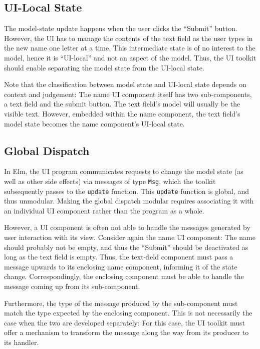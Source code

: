 \documentclass[sigplan,screen]{acmart}
\begin{document}
\subsection{UI-Local State}

The model-state update happens when the user clicks the ``Submit''
button.  However, the UI has to manage the contents of the text field
as the user types in the new name one letter at a time.  This
intermediate state is of no interest to the model, hence it is
``UI-local'' and not an aspect
of the model.  Thus, the UI toolkit should enable separating the model state
from the UI-local state.

Note that the classification between model state and UI-local state
depends on context and judgement: The name UI component itself has two
sub-components, a text field and the submit button.  The text field's
model will usually be the visible text.  However, embedded within the
name component, the text field's model state becomes the name
component's UI-local state.

\subsection{Global Dispatch}

In Elm, the UI program communicates requests to change the model state
(as well as other side effects) via messages of type \texttt{Msg},
which the toolkit subsequently passes to the \texttt{update} function.
This \texttt{update} function is global, and thus unmodular.  Making
the global dispatch modular requires associating it with an individual
UI component rather than the program as a whole.

However, a UI component is often not able to handle the messages
generated by user interaction with its view.  Consider again the name UI
component: The name should probably not be empty, and thus the
``Submit'' should be deactivated as long as the text field is empty.
Thus, the text-field component must pass a message upwards to its
enclosing name component, informing it of the state change.
Correspondingly, the enclosing component must be able to handle the
message coming up from its sub-component.

Furthermore, the type of the message produced by the sub-component
must match the type expected by the enclosing component.  This is not
necessarily the case when the two are developed separately: For this
case, the UI toolkit must offer a mechanism to transform the message
along the way from its producer to its handler.
\end{document}
